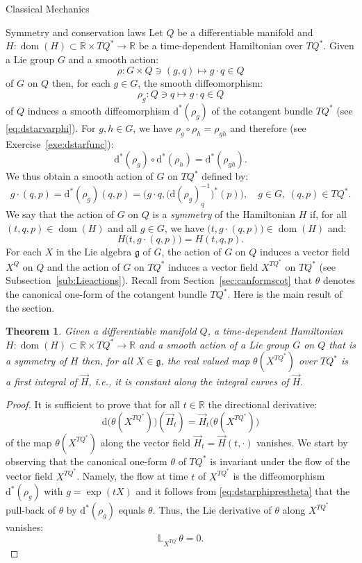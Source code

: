 \documentclass[oneside,a4paper,11pt]{amsbook}
\newcommand{\R}{\mathds R}
\newcommand{\dd}{\mathrm d}
\DeclareMathOperator{\Dom}{dom}
\theoremstyle{remark}\newtheorem{exercise}{Exercise}[chapter]
\theoremstyle{plain}\newtheorem{teo}{Theorem}[section]
\theoremstyle{plain}\newtheorem{lem}[teo]{Lemma}
\theoremstyle{plain}\newtheorem{prop}[teo]{Proposition}
\theoremstyle{plain}\newtheorem{cor}[teo]{Corollary}
\theoremstyle{definition}\newtheorem{defin}[teo]{Definition}
\theoremstyle{remark}\newtheorem{rem}[teo]{Remark}
\theoremstyle{definition}\newtheorem{notation}[teo]{Notation}
\theoremstyle{definition}\newtheorem{convention}[teo]{Convention}
\theoremstyle{definition}\newtheorem{example}[teo]{Example}
\numberwithin{section}{chapter}
\numberwithin{equation}{section}
\begin{document}
\begin{chapter}{Classical Mechanics}
\begin{section}{Symmetry and conservation laws}
Let $Q$ be a differentiable manifold and $H:\Dom(H)\subset\R\times TQ^*\to\R$ be a time-dependent Hamiltonian over $TQ^*$. Given a Lie group $G$ and a smooth
action:
\[\rho:G\times Q\ni(g,q)\longmapsto g\cdot q\in Q\]
of $G$ on $Q$ then, for each $g\in G$, the smooth diffeomorphism:
\[\rho_g:Q\ni q\longmapsto g\cdot q\in Q\]
of $Q$ induces a smooth diffeomorphism $\dd^*(\rho_g)$ of the cotangent bundle $TQ^*$ (see \eqref{eq:dstarvarphi}). For $g,h\in G$, we have
$\rho_g\circ\rho_h=\rho_{gh}$ and therefore (see Exercise~\ref{exe:dstarfunc}):
\[\dd^*(\rho_g)\circ\dd^*(\rho_h)=\dd^*(\rho_{gh}).\]
We thus obtain a smooth action of $G$ on $TQ^*$ defined by:
\[g\cdot(q,p)=\dd^*(\rho_g)(q,p)=\big(g\cdot q,\big(\dd(\rho_g)_q^{-1}\big)^{\!*}(p)\big),\quad g\in G,\ (q,p)\in TQ^*.\]
We say that the action of $G$ on $Q$ is a {\em symmetry\/} of the Hamiltonian $H$ if, for all $(t,q,p)\in\Dom(H)$ and all $g\in G$, we have
$\big(t,g\cdot(q,p)\big)\in\Dom(H)$ and:
\[H\big(t,g\cdot(q,p)\big)=H(t,q,p).\]
For each $X$ in the Lie algebra $\mathfrak g$ of $G$, the action of $G$ on $Q$ induces a vector field $X^Q$ on $Q$ and the action of $G$ on $TQ^*$ induces
a vector field $X^{TQ^*}$ on $TQ^*$ (see Subsection~\ref{sub:Lieactions}).
Recall from Section~\ref{sec:canformscot} that $\theta$ denotes the canonical one-form
of the cotangent bundle $TQ^*$. Here is the main result of the section.
\begin{teo}\label{thm:Nother}
Given a differentiable manifold $Q$, a time-depen\-dent Hamiltonian $H:\Dom(H)\subset\R\times TQ^*\to\R$ and a smooth action of a
Lie group $G$ on $Q$ that is a symmetry of $H$ then,
for all $X\in\mathfrak g$, the real valued map $\theta(X^{TQ^*})$ over $TQ^*$ is a first integral of $\vec H$, i.e., it is constant along the integral
curves of $\vec H$.
\end{teo}
\begin{proof}
It is sufficient to prove that for all $t\in\R$ the directional derivative:
\[\dd\big(\theta(X^{TQ^*})\big)(\vec H_t)=\vec H_t\big(\theta(X^{TQ^*})\big)\]
of the map $\theta(X^{TQ^*})$ along the vector field $\vec H_t=\vec H(t,\cdot)$ vanishes.
We start by observing that the canonical one-form $\theta$ of $TQ^*$ is invariant under the flow of the vector field $X^{TQ^*}$. Namely,
the flow at time $t$ of $X^{TQ^*}$ is the diffeomorphism $\dd^*(\rho_g)$ with $g=\exp(tX)$ and it follows from \eqref{eq:dstarphiprestheta} that the
pull-back of $\theta$ by $\dd^*(\rho_g)$ equals $\theta$. Thus, the Lie derivative of $\theta$ along $X^{TQ^*}$ vanishes:
\[\mathbb L_{X^{TQ^*}}\theta=0.\]

\end{proof}
\end{section}
\end{chapter}
\end{document}
